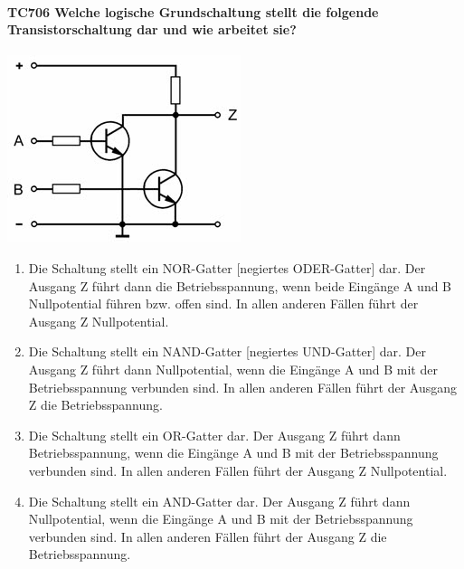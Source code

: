 \documentclass[8pt]{article}
\begin{document}
\begin{enumerate}
\begin{enumerate}[nolistsep,label=\Alph*]
{\begin{enumerate}[nolistsep,label=\Alph*]
\paragraph*{TC706 Welche logische Grundschaltung stellt die folgende Transistorschaltung dar und wie arbeitet sie?}
	\begin{center}
		\begin{minipage}{\linewidth}
			\centering
			\includegraphics[scale=1.0]{pics/tc706_a.jpg}
		\end{minipage}
	\end{center}
\begin{enumerate}[nolistsep,label=\Alph*]
\item Die Schaltung stellt ein NOR-Gatter [negiertes ODER-Gatter] dar. Der Ausgang Z führt dann die Betriebsspannung, wenn beide Eingänge A und B Nullpotential führen bzw. offen sind. In allen anderen Fällen führt der Ausgang Z Nullpotential.
\item Die Schaltung stellt ein NAND-Gatter [negiertes UND-Gatter] dar. Der Ausgang Z führt dann Nullpotential, wenn die Eingänge A und B mit der Betriebsspannung verbunden sind. In allen anderen Fällen führt der Ausgang Z die Betriebsspannung.
\item Die Schaltung stellt ein OR-Gatter dar. Der Ausgang Z führt dann Betriebsspannung, wenn die Eingänge A und B mit der Betriebsspannung verbunden sind. In allen anderen Fällen führt der Ausgang Z Nullpotential.
\item Die Schaltung stellt ein AND-Gatter dar. Der Ausgang Z führt dann Nullpotential, wenn die Eingänge A und B mit der Betriebsspannung verbunden sind. In allen anderen Fällen führt der Ausgang Z die Betriebsspannung.
\end{enumerate}


\end{enumerate}}
\end{enumerate}
\end{enumerate}
\end{document}
